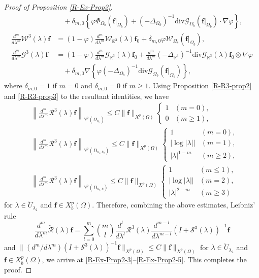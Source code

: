 \documentclass[dvipdfmx,12pt]{article}
\begin{document}
\begin{proof}[Proof of Proposition \ref{R-Ex-Prop2}]
\begin{align*}
&\quad +\delta_{m,0}\left\{\varphi\Phi_{\Omega_{b}}(\mathbf{f}|_{\Omega_{b}})+(-\Delta_{\Omega_b})^{-1}\mathrm{div}\mathcal{G}_{\Omega_b}(\mathbf{f}|_{\Omega_{b}})\cdot\nabla\varphi\right\}, \\
\frac{d^m}{d\lambda^m}\mathcal{W}^3(\lambda)\mathbf{f}&=(1-\varphi)\frac{d^m}{d\lambda^m} \mathcal{W}_{\mathbb{R}^3}(\lambda)\mathbf{f}_0+\delta_{m,0}\varphi\mathcal{W}_{\Omega_{b}}(\mathbf{f}|_{\Omega_{b}}), \\
\frac{d^m}{d\lambda^m}\mathcal{G}^3(\lambda)\mathbf{f}&=(1-\varphi)\frac{d^m}{d\lambda^m} \mathcal{G}_{\mathbb{R}^3}(\lambda)\mathbf{f}_0+ \frac{d^m}{d\lambda^m}(-\Delta_{\mathbb{R}^3})^{-1}\mathrm{div}\mathcal{G}_{\mathbb{R}^3}(\lambda)\mathbf{f}_0\otimes\nabla\varphi \\
&\quad + \delta_{m,0}\nabla\left\{\varphi(-\Delta_{\Omega_b})^{-1}\mathrm{div}\mathcal{G}_{\Omega_{b}}(\mathbf{f}|_{\Omega_{b}})\right\},
\end{align*}
where $\delta_{m,0}=1$ if $m=0$ and $\delta_{m,0}=0$ if $m\ge1$.
Using Proposition \ref{R-R3-prop2} and \ref{R-R3-prop3} to the resultant identities, we have
\begin{align*}
&\left\|\frac{d^m}{d\lambda^m}\mathcal{R}^3(\lambda)\mathbf{f}\right\|_{Y^p(\Omega_{b_1} )} 
\le C\|\mathbf{f}\|_{X^p(\Omega)}
\begin{cases}
1 & (m=0), \\
0 & (m\ge1),
\end{cases} \\
&\left\|\frac{d^m}{d\lambda^m}\mathcal{R}^3(\lambda)\mathbf{f}\right\|_{Y^p(D_{b_1,b_2})} 
\le C\|\mathbf{f}\|_{X^p(\Omega)}
\begin{cases}
1 & (m=0), \\
\left|\log |\lambda|\right| & (m=1), \\
|\lambda|^{1-m} &(m\ge2),
\end{cases} \\
&\left\|\frac{d^m}{d\lambda^m}\mathcal{R}^3(\lambda)\mathbf{f}\right\|_{Y^p( D_{b_2,b})} 
\le C\|\mathbf{f}\|_{X^p(\Omega)}
\begin{cases}
1 & (m\le 1), \\
\left|\log |\lambda|\right| & (m=2), \\
|\lambda|^{2-m} &(m\ge3)
\end{cases}
\end{align*}
for $\lambda\in \Dot{U}_{\lambda_2}$ and $\mathbf{f}\in X_b^p(\Omega)$.
Therefore, combining the above estimates, Leibniz' rule 
\[
\frac{d^m}{d\lambda^m}\widetilde{\mathcal{R}}(\lambda)\mathbf{f}=\sum_{l=0}^m \binom{m}{l} \frac{d^l}{d\lambda^l}\mathcal{R}^3(\lambda)\frac{d^{m-l}}{d\lambda^{m-l}}(I+\mathcal{S}^3(\lambda))^{-1}\mathbf{f}
\]
and $\|(d^m/d\lambda^m)(I+\mathcal{S}^3(\lambda))^{-1}\mathbf{f}\|_{X^p(\Omega)}\le C\|\mathbf{f}\|_{X^p(\Omega)}$ for $\lambda\in \Dot{U}_{\lambda_2}$ and $\mathbf{f}\in X_b^p(\Omega)$, we arrive at \eqref{R-Ex-Prop2-3}--\eqref{R-Ex-Prop2-5}.
This completes the proof.
\end{proof}
\end{document}
